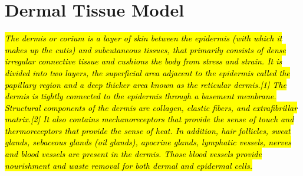 \section{Dermal Tissue Model} \label{ssec:derm_tis_mod}
\hl{\textit{The dermis or corium is a layer of skin between the epidermis (with which it makes up the cutis) and subcutaneous tissues, that primarily consists of dense irregular connective tissue and cushions the body from stress and strain. It is divided into two layers, the superficial area adjacent to the epidermis called the papillary region and a deep thicker area known as the reticular dermis.[1] The dermis is tightly connected to the epidermis through a basement membrane. Structural components of the dermis are collagen, elastic fibers, and extrafibrillar matrix.[2] It also contains mechanoreceptors that provide the sense of touch and thermoreceptors that provide the sense of heat. In addition, hair follicles, sweat glands, sebaceous glands (oil glands), apocrine glands, lymphatic vessels, nerves and blood vessels are present in the dermis. Those blood vessels provide nourishment and waste removal for both dermal and epidermal cells.
}}
